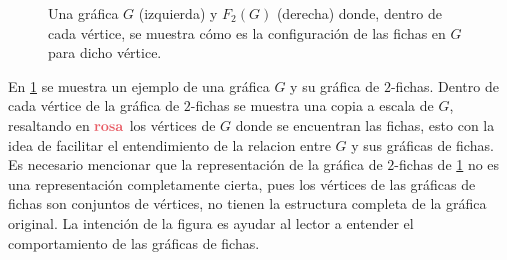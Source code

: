 \begin{figure}[ht!]
    \caption{Una gr\'afica $G$ (izquierda) y $F_2(G)$ (derecha) donde, dentro de
    cada v\'ertice, se muestra c\'omo es la configuraci\'on de las fichas en $G$
    para dicho v\'ertice.}
    \label{fig:ex-tok-graph}
\end{figure}

En \cref{fig:ex-tok-graph} se muestra un ejemplo de una gr\'afica $G$ y su
gr\'afica de $2$-fichas. Dentro de cada v\'ertice de la gr\'afica de $2$-fichas
se muestra una copia a escala de $G$, resaltando en ${\color{rosa}\bf rosa}$ los
v\'ertices de $G$ donde se encuentran las fichas, esto con la idea de facilitar
el entendimiento de la relacion entre $G$ y sus gr\'aficas de fichas. Es
necesario mencionar que la representaci\'on de la gr\'afica de $2$-fichas de
\cref{fig:ex-tok-graph} no es una representaci\'on completamente cierta, pues
los v\'ertices de las gr\'aficas de fichas son conjuntos de v\'ertices, no
tienen la estructura completa de la gr\'afica original. La intenci\'on de la
figura es ayudar al lector a entender el comportamiento de las gr\'aficas de
fichas.


